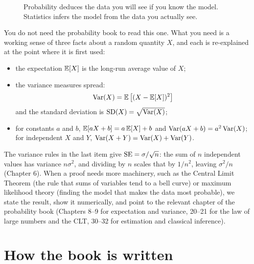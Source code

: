 \begin{figure}[htbp]
\centering
{}
\caption{Probability deduces the data you will see if you know the model. Statistics infers the model from the data you actually see.}
\label{fig:pre-prob-stat}
\end{figure}

You do not need the probability book to read this one. What you need is a
working sense of three facts about a random quantity $X$, and each is
re-explained at the point where it is first used:
\begin{itemize}
  \item the expectation $\operatorname{\mathbb{E}}[X]$ is the long-run average value of $X$;
  \item the variance measures spread:
    \[ \operatorname{Var}(X) = \operatorname{\mathbb{E}}\big[(X-\operatorname{\mathbb{E}}[X])^2\big] \]
    and the standard deviation is $\operatorname{SD}(X) = \sqrt{\operatorname{Var}(X)}$;
  \item for constants $a$ and $b$, $\operatorname{\mathbb{E}}[aX+b] = a\operatorname{\mathbb{E}}[X]+b$ and
    $\operatorname{Var}(aX+b) = a^2\operatorname{Var}(X)$; for independent $X$ and $Y$,
    $\operatorname{Var}(X+Y) = \operatorname{Var}(X)+\operatorname{Var}(Y)$.
\end{itemize}
The variance rules in the last item give $\operatorname{SE} = \sigma/\sqrt{n}$: the sum of
$n$ independent values has variance $n\sigma^2$, and dividing by $n$ scales
that by $1/n^2$, leaving $\sigma^2/n$ (Chapter 6). When a proof
needs more machinery, such as the Central Limit Theorem (the rule that sums of variables tend to a bell curve) or maximum likelihood
theory (finding the model that makes the data most probable), we state the result, show it numerically, and point to the relevant
chapter of the probability book (Chapters 8--9 for expectation and variance,
20--21 for the law of large numbers and the CLT, 30--32 for estimation and
classical inference).

\section*{How the book is written}

